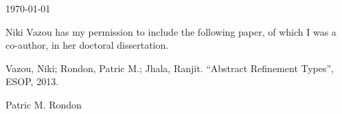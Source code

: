 \documentclass{article}
\begin{document}
\today

Niki Vazou has my permission to include the following paper, of which
I was a co-author, in her doctoral dissertation.

Vazou, Niki; Rondon, Patric M.; Jhala, Ranjit. ``Abstract Refinement Types'', ESOP, 2013.

\baselineskip
Patric M. Rondon
\end{document}
